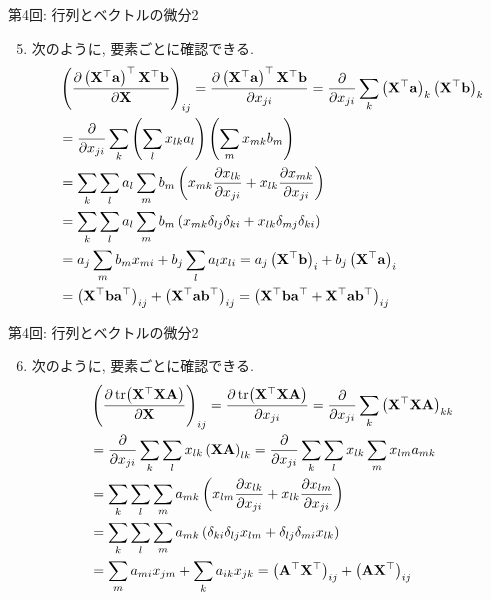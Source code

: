 \documentclass[dvipdfmx,notheorems,t]{beamer}
\begin{document}
\begin{frame}{第4回: 行列とベクトルの微分2}
\begin{enumerate}
  \setcounter{enumi}{4}
  \item 次のように, 要素ごとに確認できる.
  {\small \begin{align*}
    & \left( \pdv{\left( \vb{X}^\top \vb{a} \right)^\top \vb{X}^\top \vb{b}}{\vb{X}} \right)_{ij}
      = \pdv{\left( \vb{X}^\top \vb{a} \right)^\top \vb{X}^\top \vb{b}}{x_{ji}}
      = \pdv{x_{ji}} \sum_k \left( \vb{X}^\top \vb{a} \right)_k \left( \vb{X}^\top \vb{b} \right)_k \\
      &= \pdv{x_{ji}} \sum_k \left( \sum_l x_{lk} a_l \right) \left( \sum_m x_{mk} b_m \right) \\
      &= \sum_k \sum_l a_l \sum_m b_m
        \left( x_{mk} \pdv{x_{lk}}{x_{ji}} + x_{lk} \pdv{x_{mk}}{x_{ji}} \right) \\
      &= \sum_k \sum_l a_l \sum_m b_m
        \left( x_{mk} \delta_{lj} \delta_{ki} + x_{lk} \delta_{mj} \delta_{ki} \right) \\
      &= a_j \sum_m b_m x_{mi} + b_j \sum_l a_l x_{li}
      = a_j \left( \vb{X}^\top \vb{b} \right)_i + b_j \left( \vb{X}^\top \vb{a} \right)_i \\
      &= \left( \vb{X}^\top \vb{b} \vb{a}^\top \right)_{ij}
        + \left( \vb{X}^\top \vb{a} \vb{b}^\top \right)_{ij}
      = \left( \vb{X}^\top \vb{b} \vb{a}^\top + \vb{X}^\top \vb{a} \vb{b}^\top \right)_{ij}
  \end{align*}}
\end{enumerate}
\end{frame}

\begin{frame}{第4回: 行列とベクトルの微分2}
\begin{enumerate}
  \setcounter{enumi}{5}
  \item 次のように, 要素ごとに確認できる.
  \begin{align*}
    & \left( \pdv{\tr(\vb{X}^\top \vb{X} \vb{A})}{\vb{X}} \right)_{ij}
      = \pdv{\tr(\vb{X}^\top \vb{X} \vb{A})}{x_{ji}}
      = \pdv{x_{ji}} \sum_k \left( \vb{X}^\top \vb{X} \vb{A} \right)_{kk} \\
      &= \pdv{x_{ji}} \sum_k \sum_l x_{lk} \left( \vb{X} \vb{A} \right)_{lk}
      = \pdv{x_{ji}} \sum_k \sum_l x_{lk} \sum_m x_{lm} a_{mk} \\
      &= \sum_k \sum_l \sum_m a_{mk} \left( x_{lm} \pdv{x_{lk}}{x_{ji}}
        + x_{lk} \pdv{x_{lm}}{x_{ji}} \right) \\
      &= \sum_k \sum_l \sum_m a_{mk} \left( \delta_{ki} \delta_{lj} x_{lm}
        + \delta_{lj} \delta_{mi} x_{lk} \right) \\
      &= \sum_m a_{mi} x_{jm} + \sum_k a_{ik} x_{jk}
      = \left( \vb{A}^\top \vb{X}^\top \right)_{ij} + \left( \vb{A} \vb{X}^\top \right)_{ij}
  \end{align*}
\end{enumerate}
\end{frame}
\end{document}
